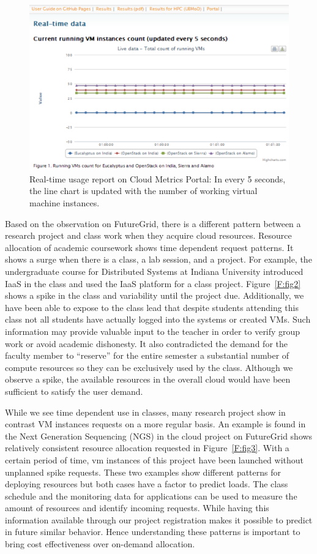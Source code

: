 \documentclass{sig-alternate-05-2015}
\begin{document}
\begin{figure}[htb] 
  \centering 
    \includegraphics[width=1.0\columnwidth]{images/metrics-portal-realtime.pdf} 
  \caption{Real-time usage report on Cloud Metrics Portal: In every 5 seconds, the line chart is updated with the number of working virtual machine instances.}\label{F:fig9} 
\end{figure} 

Based on the observation on FutureGrid, there is a different pattern between a research project and class work when they acquire cloud resources. Resource allocation of academic coursework shows time dependent request patterns. It shows a surge when there is a class, a lab session, and a project. For example, the undergraduate course for Distributed Systems at Indiana University introduced IaaS in the class and used the IaaS platform for a class project. Figure~\ref{F:fig2} shows a spike in the class and variability until the project due.  Additionally, we have been able to expose to the class lead that despite students attending this class not all students have actually logged into the systems or created VMs. Such information may provide valuable input to the teacher in order to verify group work or avoid academic dishonesty. It also contradicted the demand for the faculty member to ``reserve'' for the entire semester a substantial number of compute resources so they can be exclusively used by the class. Although we observe a spike, the available resources in the overall cloud would have been sufficient to satisfy the user demand.

While we see time dependent use in classes, many research project show in contrast VM instances requests on a more regular basis. An example is found in the Next Generation Sequencing (NGS) in the cloud project on FutureGrid shows relatively consistent resource allocation requested in Figure~\ref{F:fig3}. With a certain period of time, vm instances of this project have been launched without unplanned spike requests. These two examples show different patterns for deploying resources but both cases have a factor to predict loads. The class schedule and the monitoring data for applications can be used to measure the amount of resources and identify incoming requests.  While having this information available through our project registration makes it possible to predict in future similar behavior.  Hence understanding these patterns is important to bring cost effectiveness over on-demand allocation.
\end{document}
